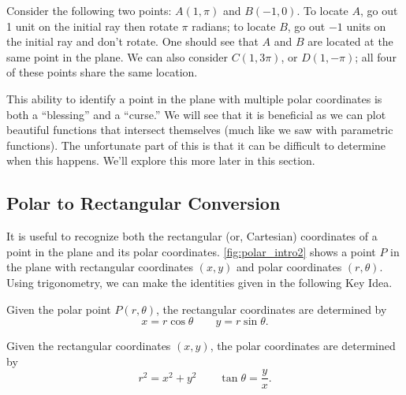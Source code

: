 Consider the following two points: $A(1,\pi)$ and $B(-1,0)$. To locate $A$, go out 1 unit on the initial ray then rotate $\pi$ radians; to locate $B$, go out $-1$ units on the initial ray and don't rotate. One should see that $A$ and $B$ are located at the same point in the plane. We can also consider $C(1,3\pi)$, or $D(1,-\pi)$; all four of these points share the same location. 

This ability to identify a point in the plane with multiple polar coordinates is both a ``blessing'' and a ``curse.'' We will see that it is beneficial as we can plot beautiful functions that intersect themselves (much like we saw with parametric functions). The unfortunate part of this is that it can be difficult to determine when this happens. We'll explore this more later in this section.

\subsection{Polar to Rectangular Conversion}


It is useful to recognize both the rectangular (or, Cartesian) coordinates of a point in the plane and its polar coordinates. \autoref{fig:polar_intro2} shows a point $P$ in the plane with rectangular coordinates $(x,y)$ and polar coordinates $(r,\theta)$. Using trigonometry, we can make the identities given in the following Key Idea.

\begin{keyidea}\label{idea:polarconvert}%
Given the polar point $P(r,\theta)$, the rectangular coordinates are determined by \[x=r\cos \theta\qquad y=r\sin \theta.\]

Given the rectangular coordinates $(x,y)$, the polar coordinates are determined by
\[r^2=x^2+y^2\qquad \tan \theta = \frac yx.\]
\end{keyidea}


